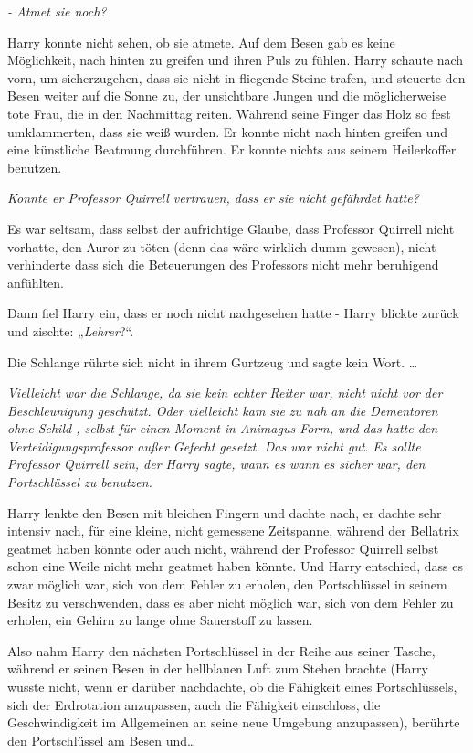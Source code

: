 {\emph{- Atmet sie noch?}

Harry konnte nicht sehen, ob sie atmete. Auf dem Besen gab es keine Möglichkeit, nach hinten zu greifen und ihren Puls zu fühlen. Harry schaute nach vorn, um sicherzugehen, dass sie nicht in fliegende Steine trafen, und steuerte den Besen weiter auf die Sonne zu, der unsichtbare Jungen und die möglicherweise tote Frau, die in den Nachmittag reiten. Während seine Finger das Holz so fest umklammerten, dass sie weiß wurden. Er konnte nicht nach hinten greifen und eine künstliche Beatmung durchführen. Er konnte nichts aus seinem Heilerkoffer benutzen.

\emph{Konnte er Professor Quirrell vertrauen, dass er sie nicht gefährdet hatte?}

Es war seltsam, dass selbst der aufrichtige Glaube, dass Professor Quirrell nicht vorhatte, den Auror zu töten (denn das wäre wirklich dumm gewesen), nicht verhinderte dass sich die Beteuerungen des Professors nicht mehr beruhigend anfühlten.

Dann fiel Harry ein, dass er noch nicht nachgesehen hatte - Harry blickte zurück und zischte: „\emph{Lehrer}?“.

Die Schlange rührte sich nicht in ihrem Gurtzeug und sagte kein Wort. …

\emph{Vielleicht war die Schlange, da sie kein echter Reiter war, nicht nicht vor der Beschleunigung geschützt. Oder vielleicht kam sie zu nah an die Dementoren ohne Schild , selbst für einen Moment in Animagus-Form, und das hatte den Verteidigungsprofessor außer Gefecht gesetzt. Das war nicht gut}. \emph{Es sollte Professor Quirrell sein, der Harry sagte, wann es wann es sicher war, den Portschlüssel zu benutzen.}

Harry lenkte den Besen mit bleichen Fingern und dachte nach, er dachte sehr intensiv nach, für eine kleine, nicht gemessene Zeitspanne, während der Bellatrix geatmet haben könnte oder auch nicht, während der Professor Quirrell selbst schon eine Weile nicht mehr geatmet haben könnte. Und Harry entschied, dass es zwar möglich war, sich von dem Fehler zu erholen, den Portschlüssel in seinem Besitz zu verschwenden, dass es aber nicht möglich war, sich von dem Fehler zu erholen, ein Gehirn zu lange ohne Sauerstoff zu lassen.

Also nahm Harry den nächsten Portschlüssel in der Reihe aus seiner Tasche, während er seinen Besen in der hellblauen Luft zum Stehen brachte (Harry wusste nicht, wenn er darüber nachdachte, ob die Fähigkeit eines Portschlüssels, sich der Erdrotation anzupassen, auch die Fähigkeit einschloss, die Geschwindigkeit im Allgemeinen an seine neue Umgebung anzupassen), berührte den Portschlüssel am Besen und…

}
